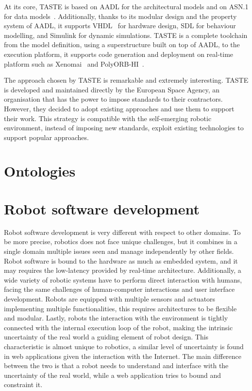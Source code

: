At its core, TASTE is based on AADL for the architectural models and on ASN.1 for data models~\cite{perrotin2011taste}. Additionally, thanks to its modular design and the property system of AADL, it supports VHDL~\cite{navabi1997vhdl} for hardware design, SDL for behaviour modelling, and Simulink for dynamic simulations. TASTE is a complete toolchain from the model definition, using a superstructure built on top of AADL, to the execution platform, it supports code generation and deployment on real-time platform such as Xenomai~\cite{gerum2004xenomai} and PolyORB-HI~\cite{vergnaud2004polyorb}.

The approach chosen by TASTE is remarkable and extremely interesting. TASTE is developed and maintained directly by the European Space Agency, an organisation that has the power to impose standards to their contractors. However, they decided to adopt existing approaches and use them to support their work. This strategy is compatible with the self-emerging robotic environment, instead of imposing new standards, exploit existing technologies to support popular approaches.

\section{Ontologies}

\section{Robot software development}
Robot software development is very different with respect to other domains. To be more precise, robotics does not face unique challenges, but it combines in a single domain multiple issues seen and manage independently by other fields. Robot software is bound to the hardware as much as embedded system, and it may requires the low-latency provided by real-time architecture. Additionally, a wide variety of robotic systems have to perform direct interaction with humans, facing the same challenges of human-computer interactions and user interface development. Robots are equipped with multiple sensors and actuators implementing multiple functionalities, this requires architectures to be flexible and modular. Lastly, robots the interaction with the environment is tightly connected with the internal execution loop of the robot, making the intrinsic uncertainty of the real world a guiding element of robot design. This characteristic is almost unique to robotics, a similar level of uncertainty is found in web applications given the interaction with the Internet. The main difference between the two is that a robot needs to understand and interface with the uncertainty of the real world, while a web application tries to bound and constraint it.

